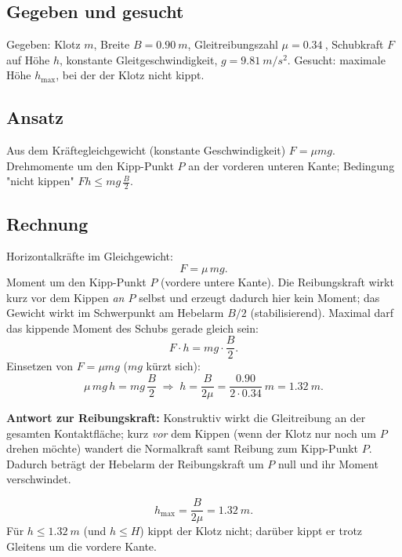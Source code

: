 
\subsection*{Gegeben und gesucht}
Gegeben: Klotz $m$, Breite $B=\qty{0.90}{m}$, Gleitreibungszahl
$\mu=\qty{0.34}{}$, Schubkraft $F$ auf Höhe $h$, konstante
Gleitgeschwindigkeit, $g=\qty{9.81}{m/s^2}$.
Gesucht: maximale Höhe $h_\mathrm{max}$, bei der der Klotz nicht kippt.

\subsection*{Ansatz}
Aus dem Kräftegleichgewicht (konstante Geschwindigkeit) $F=\mu mg$. Drehmomente
um den Kipp-Punkt $P$ an der vorderen unteren Kante; Bedingung "nicht
kippen" $Fh\le mg\,\frac B2$.

\subsection*{Rechnung}
Horizontalkräfte im Gleichgewicht:
\begin{equation}
  F = \mu\, m g.
\end{equation}
Moment um den Kipp-Punkt $P$ (vordere untere Kante). Die Reibungskraft wirkt
kurz vor dem Kippen \emph{an $P$} selbst und erzeugt dadurch hier kein Moment;
das Gewicht wirkt im Schwerpunkt am Hebelarm $B/2$ (stabilisierend). Maximal
darf das kippende Moment des Schubs gerade gleich sein:
\begin{equation}
  F\cdot h = m g\cdot \frac B2.
\end{equation}
Einsetzen von $F=\mu m g$ ($m g$ kürzt sich):
\begin{equation}
  \mu\,m g\, h = m g\,\frac B2
  \;\Rightarrow\;
  h = \frac{B}{2\mu}
  = \frac{0.90}{2\cdot 0.34}\ \si{m}
  = \qty{1.32}{m}.
\end{equation}

\textbf{Antwort zur Reibungskraft:} Konstruktiv wirkt die Gleitreibung an der
gesamten Kontaktfläche; kurz \emph{vor} dem Kippen (wenn der Klotz nur noch um
$P$ drehen möchte) wandert die Normalkraft samt Reibung zum Kipp-Punkt $P$.
Dadurch beträgt der Hebelarm der Reibungskraft um $P$ null und ihr Moment
verschwindet.

\begin{ergebnis}
\begin{equation*}
  h_\mathrm{max} = \frac{B}{2\mu} = \qty{1.32}{m}.
\end{equation*}
Für $h\le\qty{1.32}{m}$ (und $h\le H$) kippt der Klotz nicht; darüber kippt er
trotz Gleitens um die vordere Kante.
\end{ergebnis}

